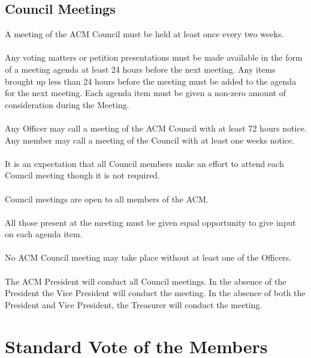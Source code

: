 \documentclass[12pt,titlepage]{article}
\begin{document}
\subsection{Council Meetings}

A meeting of the ACM Council must be held at least once every two weeks.\\
\\
Any voting matters or petition presentations must be made available in the form of a meeting agenda at least 24 hours before the next meeting. Any items brought up less than 24 hours before the meeting must be added to the agenda for the next meeting. Each agenda item must be given a non-zero amount of consideration during the Meeting.\\
\\
Any Officer may call a meeting of the ACM Council with at least 72 hours notice.\\

Any member may call a meeting of the Council with at least one weeks notice.\\
\\
It is an expectation that all Council members make an effort to attend each Council meeting though it is not required.\\
\\
Council meetings are open to all members of the ACM.\\
\\
All those present at the meeting must be given equal opportunity to give input on each agenda item.\\
\\
No ACM Council meeting may take place without at least one of the Officers.\\
\\
The ACM President will conduct all Council meetings. In the absence of the President the Vice President will conduct the meeting. In the absence of both the President and Vice President, the Treasurer will conduct the meeting.

\section{Standard Vote of the Members}
\end{document}
